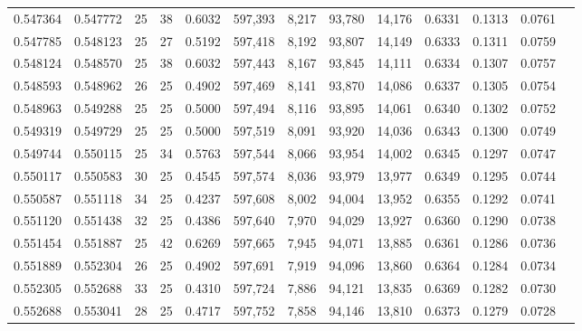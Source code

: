 \begin{tabular}{rrrrrrrrrrrrr}
0.547364 & 0.547772 &    25 &  38 &                                     0.6032 & 597,393 &   8,217 &  93,780 &  14,176 & 0.6331 & 0.1313 & 0.0761 \\
0.547785 & 0.548123 &    25 &  27 &                                     0.5192 & 597,418 &   8,192 &  93,807 &  14,149 & 0.6333 & 0.1311 & 0.0759 \\
0.548124 & 0.548570 &    25 &  38 &                                     0.6032 & 597,443 &   8,167 &  93,845 &  14,111 & 0.6334 & 0.1307 & 0.0757 \\
0.548593 & 0.548962 &    26 &  25 &                                     0.4902 & 597,469 &   8,141 &  93,870 &  14,086 & 0.6337 & 0.1305 & 0.0754 \\
0.548963 & 0.549288 &    25 &  25 &                                     0.5000 & 597,494 &   8,116 &  93,895 &  14,061 & 0.6340 & 0.1302 & 0.0752 \\
0.549319 & 0.549729 &    25 &  25 &                                     0.5000 & 597,519 &   8,091 &  93,920 &  14,036 & 0.6343 & 0.1300 & 0.0749 \\
0.549744 & 0.550115 &    25 &  34 &                                     0.5763 & 597,544 &   8,066 &  93,954 &  14,002 & 0.6345 & 0.1297 & 0.0747 \\
0.550117 & 0.550583 &    30 &  25 &                                     0.4545 & 597,574 &   8,036 &  93,979 &  13,977 & 0.6349 & 0.1295 & 0.0744 \\
0.550587 & 0.551118 &    34 &  25 &                                     0.4237 & 597,608 &   8,002 &  94,004 &  13,952 & 0.6355 & 0.1292 & 0.0741 \\
0.551120 & 0.551438 &    32 &  25 &                                     0.4386 & 597,640 &   7,970 &  94,029 &  13,927 & 0.6360 & 0.1290 & 0.0738 \\
0.551454 & 0.551887 &    25 &  42 &                                     0.6269 & 597,665 &   7,945 &  94,071 &  13,885 & 0.6361 & 0.1286 & 0.0736 \\
0.551889 & 0.552304 &    26 &  25 &                                     0.4902 & 597,691 &   7,919 &  94,096 &  13,860 & 0.6364 & 0.1284 & 0.0734 \\
0.552305 & 0.552688 &    33 &  25 &                                     0.4310 & 597,724 &   7,886 &  94,121 &  13,835 & 0.6369 & 0.1282 & 0.0730 \\
0.552688 & 0.553041 &    28 &  25 &                                     0.4717 & 597,752 &   7,858 &  94,146 &  13,810 & 0.6373 & 0.1279 & 0.0728 \\

\end{tabular}
